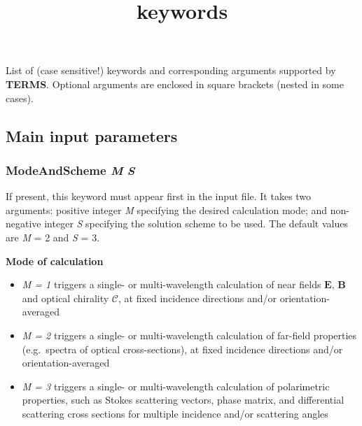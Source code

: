 \documentclass[
]{article}
\title{keywords}
\author{}
\date{\vspace{-2.5em}}
\providecommand{\tightlist}{%
  \setlength{\itemsep}{0pt}\setlength{\parskip}{0pt}}
\begin{document}
\maketitle

\newcommand{\bE}{\mathbf{E}}
\newcommand{\bB}{\mathbf{B}}
\newcommand{\ldoc}{\mathscr{C}}
\newcommand{\ldocbar}{\overline{\mathscr{C}}}
\newcommand{\ldocoa}{\langle\mathscr{C}\rangle}
\newcommand{\ldocoabar}{\langle\overline{\mathscr{C}}\rangle}

List of (case sensitive!) keywords and corresponding arguments supported
by \textbf{TERMS}. Optional arguments are enclosed in square brackets
(nested in some cases).

\hypertarget{main-input-parameters}{%
\subsection{Main input parameters}\label{main-input-parameters}}

\hypertarget{modeandscheme-m-s}{%
\subsubsection{\texorpdfstring{ModeAndScheme \emph{M}
\emph{S}}{ModeAndScheme M S}}\label{modeandscheme-m-s}}

If present, this keyword must appear first in the input file. It takes
two arguments: positive integer \emph{M} specifying the desired
calculation mode; and non-negative integer \emph{S} specifying the
solution scheme to be used. The default values are \emph{M} = 2 and
\emph{S} = 3.

\textbf{Mode of calculation}

\begin{itemize}
\tightlist
\item
  \emph{M = 1} triggers a single- or multi-wavelength calculation of
  near fields \(\mathbf{E}\), \(\mathbf{B}\) and optical chirality
  \(\mathscr{C}\), at fixed incidence directions and/or
  orientation-averaged
\item
  \emph{M = 2} triggers a single- or multi-wavelength calculation of
  far-field properties (e.g.~spectra of optical cross-sections), at
  fixed incidence directions and/or orientation-averaged
\item
  \emph{M = 3} triggers a single- or multi-wavelength calculation of
  polarimetric properties, such as Stokes scattering vectors, phase
  matrix, and differential scattering cross sections for multiple
  incidence and/or scattering angles
\end{itemize}
\end{document}
